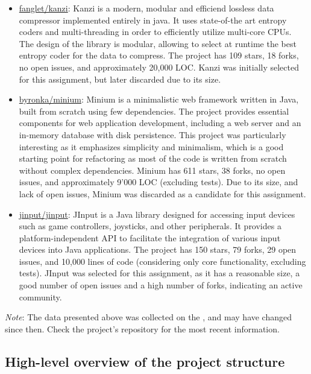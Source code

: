 \begin{itemize}
	\item \href{https://github.com/flanglet/kanzi}{fanglet/kanzi}: Kanzi is a modern, modular and efficiend lossless data compressor implemented entirely in java. It uses state-of-the art entropy coders and multi-threading in order to efficiently utilize multi-core CPUs. The design of the library is modular, allowing to select at runtime the best entropy coder for the data to compress. The project has 109 stars, 18 forks, no open issues, and approximately 20,000 LOC. Kanzi was initially selected for this assignment, but later discarded due to its size.
	\item \href{https://github.com/byronka/minum}{byronka/minium}: Minium is a minimalistic web framework written in Java, built from scratch using few dependencies. The project provides essential components for web application development, including a web server and an in-memory database with disk persistence. This project was particularly interesting as it emphasizes simplicity and minimalism, which is a good starting point for refactoring as most of the code is written from scratch without complex dependencies. Minium has 611 stars, 38 forks, no open issues, and approximately 9'000 LOC (excluding tests). Due to its size, and lack of open issues, Minium was discarded as a candidate for this assignment.
	\item \href{https://github.com/jinput/jinput}{jinput/jinput}: JInput is a Java library designed for accessing input devices such as game controllers, joysticks, and other peripherals. It provides a platform-independent API to facilitate the integration of various input devices into Java applications. The project has 150 stars, 79 forks, 29 open issues, and 10,000 lines of code (considering only core functionality, excluding tests). JInput was selected for this assignment, as it has a reasonable size, a good number of open issues and a high number of forks, indicating an active community.
\end{itemize}

\noindent \textit{Note}: The data presented above was collected on the , and may have changed since then. Check the project's repository for the most recent information.

\subsection{High-level overview of the project structure}

